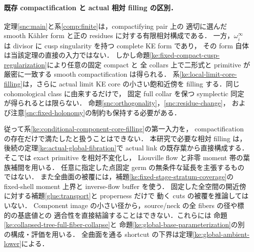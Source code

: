 \paragraph{既存 compactification と actual 相対 filling の区別．}
定理\ref{snc:main}と系\ref{comp:finite}は，compactifying pair 上の
適切に選んだ smooth K\"ahler form と正の residues に対する有限相対構成である．
一方，$\omega_i^\infty$ は divisor に cusp singularity を持つ complete KE form であり，
その form 自体は当該定理の直接の入力ではない．
しかし命題\ref{ke:fixed-compact-cusp-regularization}により任意の固定 compact と
全 collars 上で二形式と primitive が厳密に一致する smooth compactification は得られる．
系\ref{ke:local-limit-core-filling}は，さらに actual limit KE core の小さい飽和近傍を filling する．同じ cohomological class に由来するだけで，
固定 full collar を保つ symplectic 同定が得られるとは限らない．
命題\ref{snc:orthogonality}，\ref{snc:residue-change}，
および注意\ref{snc:fixed-holonomy}の制約も保持する必要がある．

従って系\ref{ke:conditional-component-core-filling}の第一入力を，
compactification の存在だけで満たしたと扱うことはできない．
本研究で必要な相対 filling は，後続の定理\ref{ke:actual-global-fibration}で
actual link の既存葉から直接構成する．そこでは exact primitive を相対不変化し，
Liouville flow と非零 moment 帯の葉族補間を用いる．
任意に指定した点固定 germ の無条件な延長を主張するものではない．
また全曲面の被覆には，補題\ref{ke:fixed-stage-stratum-coverage}の
fixed-shell moment 上界と inverse-flow buffer を使う．
固定した全空間の開近傍に対する補題\ref{glue:transport}と properness だけで
動く cuts の被覆を推論してはいない．
Component image の小さい径から，source/neck の全 fibers の径や標的の基底値との
適合性を直接結論することはできない．これらには
命題\ref{ke:collapsed-tree-full-fiber-collapse}と
命題\ref{ke:global-base-parameterization}の別の構成・評価を用いる．
全曲面を通る shortcut の下界は定理\ref{ke:global-ambient-lower}による．
